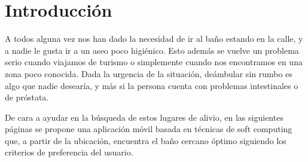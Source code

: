 \documentclass[13pt,a4paper]{article}
\begin{document}
    
    







\section{Introducción}

A todos alguna vez nos han dado la necesidad de ir al baño estando en la calle, y a nadie le gusta ir a un aseo poco higiénico.
Esto además se vuelve un problema serio cuando viajamos de turismo o simplemente cuando nos encontramos en una zona poco conocida. Dada la urgencia de la situación, deámbular sin rumbo es algo que nadie desearía, y más si la persona cuenta con problemas intestinales o de próstata.

\vspace{\baselineskip}




De cara a ayudar en la búsqueda de estos lugares de alivio, en las siguientes páginas se propone una aplicación móvil basada en técnicas de soft computing que, a partir de la ubicación, encuentra el baño cercano óptimo siguiendo los criterios de preferencia del usuario.
\end{document}
